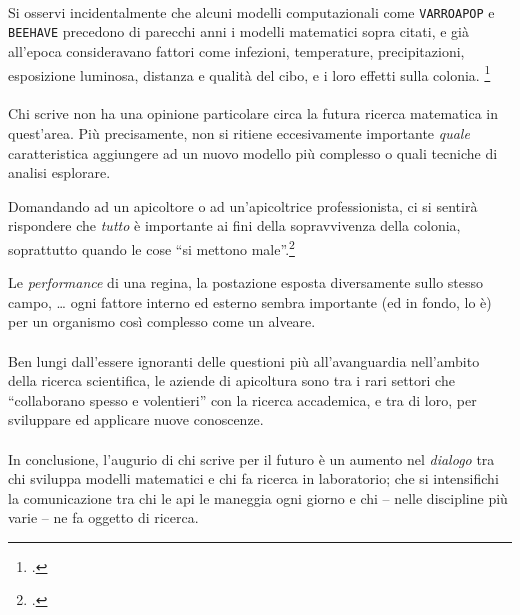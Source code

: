 \paragraph{}
Si osservi incidentalmente che alcuni modelli computazionali come \texttt{VARROAPOP} e \texttt{BEEHAVE} precedono
di parecchi anni i modelli matematici sopra citati, e già all'epoca consideravano fattori come infezioni,
temperature, precipitazioni, esposizione luminosa, distanza e qualità del cibo, e i loro effetti sulla colonia. %
\footcite{compMod1,compMod2,compMod3,compMod4}

\paragraph{}
Chi scrive non ha una opinione particolare circa la futura ricerca matematica in quest'area.
Più precisamente, non si ritiene eccesivamente importante \emph{quale} caratteristica aggiungere ad un nuovo
modello più complesso o quali tecniche di analisi esplorare.

Domandando ad un apicoltore o ad un'apicoltrice professionista, ci si sentirà rispondere che \emph{tutto} è
importante ai fini della sopravvivenza della colonia, soprattutto quando
le cose ``si mettono male''.\footcite{privFDL,privFPan}

Le \emph{performance} di una regina, la postazione esposta diversamente sullo stesso campo, \dots
ogni fattore interno ed esterno sembra importante (ed in fondo, lo è) per un organismo così complesso come un alveare.

\paragraph{}
Ben lungi dall'essere ignoranti delle questioni più all'avanguardia nell'ambito della ricerca scientifica,
le aziende di apicoltura sono tra i rari settori che ``collaborano spesso e volentieri'' con la ricerca accademica,
e tra di loro, per sviluppare ed applicare nuove conoscenze.

\paragraph{}
In conclusione, l'augurio di chi scrive per il futuro è un aumento nel \emph{dialogo} tra chi sviluppa modelli matematici
e chi fa ricerca in laboratorio; che si intensifichi la comunicazione tra chi le api le maneggia ogni giorno e chi
-- nelle discipline più varie -- ne fa oggetto di ricerca.



